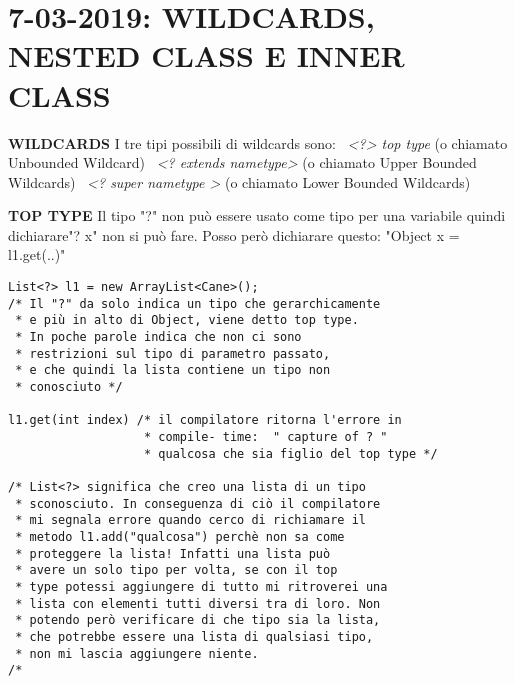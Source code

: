 

\newpage
\section{7-03-2019: WILDCARDS, NESTED CLASS E INNER CLASS}
\textbf{WILDCARDS} \newline
I tre tipi possibili di wildcards sono: \newline
\textbullet\ \textit{<?> top type} (o chiamato Unbounded Wildcard) \newline
\textbullet\ \textit{<? extends nametype>} (o chiamato Upper Bounded Wildcards)\newline
\textbullet\ \textit{<? super nametype >} (o chiamato Lower Bounded Wildcards)\newline

\noindent \textbf{TOP TYPE} \newline
Il tipo "?" non può essere usato come tipo per una variabile quindi dichiarare"? x" non si può fare. Posso però dichiarare questo: "Object x = l1.get(..)"
\begin{lstlisting}[basicstyle=\small,]
List<?> l1 = new ArrayList<Cane>();
/* Il "?" da solo indica un tipo che gerarchicamente
 * e più in alto di Object, viene detto top type.
 * In poche parole indica che non ci sono 
 * restrizioni sul tipo di parametro passato,
 * e che quindi la lista contiene un tipo non
 * conosciuto */

l1.get(int index) /* il compilatore ritorna l'errore in
				   * compile- time:  " capture of ? " 
				   * qualcosa che sia figlio del top type */
				   
/* List<?> significa che creo una lista di un tipo
 * sconosciuto. In conseguenza di ciò il compilatore 
 * mi segnala errore quando cerco di richiamare il
 * metodo l1.add("qualcosa") perchè non sa come
 * proteggere la lista! Infatti una lista può
 * avere un solo tipo per volta, se con il top
 * type potessi aggiungere di tutto mi ritroverei una
 * lista con elementi tutti diversi tra di loro. Non
 * potendo però verificare di che tipo sia la lista,
 * che potrebbe essere una lista di qualsiasi tipo,
 * non mi lascia aggiungere niente.
/*
			   
\end{lstlisting}

